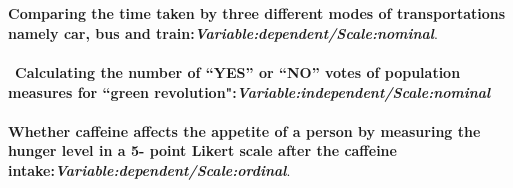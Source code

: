 \documentclass[a4paper,12pt]{article}
\newcommand{\<}{\langle}
\renewcommand{\>}{\rangle}
\newcommand{\1}{\mathbbm{1}}
\begin{document}
\section{}
\textbf{Comparing the time taken by three different modes of transportations namely car, bus
and train:}\textbf{\textit{Variable:dependent/Scale:nominal}}.\\\\\                                  \textbf{Calculating the number of “YES” or “NO” votes of population measures for “green
revolution":}\textbf{\textit{Variable:independent/Scale:nominal}}  \\\\                              \textbf{Whether caffeine affects the appetite of a person by measuring the hunger level in a 5-
point Likert scale after the caffeine intake:}\textbf{\textit{Variable:dependent/Scale:ordinal}}.
\end{document}
